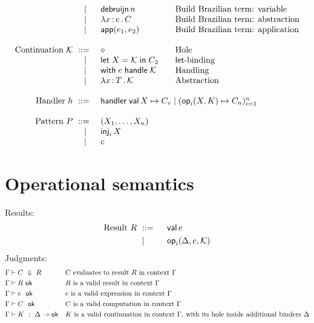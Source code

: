 \documentclass{article}
\newcommand{\C}{C}     %
\newcommand{\K}{K}     %
\newcommand{\X}{X}     %
\newcommand{\rgn}{r}   %
\newcommand{\h}{h}     %
\newcommand{\KK}{{\cal K}} %
\newcommand{\val}{\mathsf{val}\,} %
\newcommand{\letin}[1]{\mathsf{let}\; #1 \;\mathsf{in}\;} %
\newcommand{\opPat}[3][i]{\mathsf{op}_{#1}(#2, #3)} %
\newcommand{\opRes}[4][i]{\mathsf{op}_{#1}(#2, #3, #4)} %
\newcommand{\withhandle}[1]{\mathsf{with}\;#1\;\mathsf{handle}\;} %
\newcommand{\abs}[1]{\mathsf{abs}\;#1\;\mathsf{in}\;} %
\newcommand{\ttlam}[2]{\lambda #1 \,{:}\, #2 \,.\,} %
\newcommand{\handler}[6][n]{\mathsf{handler}\; \val #2 \mapsto #3 \mid (\opPat{#4}{#5} \mapsto #6_{#1})_{i=1}^{#1}}
\newcommand{\makeApp}[2]{\mathsf{app}(#1,#2)} %
\newcommand{\debruijn}[1]{\mathsf{debruijn}\,#1} %
\newcommand{\hole}{\diamond}
\newcommand{\tuple}[1]{(#1)}
\newcommand{\pat}{P}
\renewcommand{\c}{c} %
\newcommand{\inj}[2][i]{\mathsf{inj}_{#1}\, #2}
\newcommand{\evalto}[3][\G]{#1 \vdash #2 \ \Downarrow\  #3}
\newcommand{\resultok}[2][\G]{#1 \vdash #2 \ \mathsf{ok}}
\newcommand{\eok}[2][\G]{#1 \vdash #2 \ \ \mathsf{ok}}
\newcommand{\cok}[2][\G]{#1 \vdash #2 \ \ \mathsf{ok}}
\newcommand{\kok}[3][\G]{#1 \vdash #3 \ : \ #2\to\mathsf{ok}}
\newcommand{\typicalhandler}{\handler{\X}{\C_v}{\X}{\K}{\C}}
\begin{document}
\begin{equation*}
\begin{array}{rl@{\qquad}l}
    \bnfor  & \debruijn{n} & \text{Build Brazilian term: variable} \\
    \bnfor  & \ttlam{\x}{\e} \C   & \text{Build Brazilian term: abstraction} \\
    \bnfor  & \makeApp{\e_1}{\e_2} & \text{Build Brazilian term: application} \\
    \\
    \text{Continuation $\KK$} \bnf    & \hole                & \text{Hole} \\
    \bnfor  & \letin{\X = \KK} \C_2  & \text{$\mathsf{let}$-binding} \\
    \bnfor  & \withhandle{\e} \KK & \text{Handling} \\
    \bnfor  & \ttlam{\x}{\T}{\KK} & \text{Abstraction} \\
    \\

  \text{Handler $\h$}
  \bnf & \multicolumn{2}{l}{\typicalhandler}\\
  \\
  \text{Pattern $\pat$}
  \bnf & \tuple{\X_1,\ldots,\X_n}\\
  \bnfor & \inj{\X}\\
  \bnfor & \c\\
\end{array}
\end{equation*}



\section{Operational semantics}
\label{sec:oper-semant}

Results:
%
\begin{equation*}
  \text{Result $R$}
  \begin{aligned}[t]
    &\bnf   {} && \val \e \\
    &\bnfor {} && \opRes{\D}{\e}{\KK} \\
  \end{aligned}
\end{equation*}
%
Judgments:
%
\begin{align*}
  &\evalto[\G]{C}{R} &&\text{$C$ evaluates to result $R$ in context $\G$} \\
  &\resultok[\G]{R}  &&\text{$R$ is a valid result in context $\G$} \\
  &\eok[\G]{\e} &&\text{$\e$ is a valid expression in context $\G$} \\
  &\cok[\G]{\C} &&\text{$\C$ is a valid computation in context $\G$} \\
  &\kok[\G]{\D}{\K} &&\text{$\K$ is a valid continuation in context $\G$,
                              with its hole inside additional binders $\D$} \\
\end{align*}
%
\end{document}
